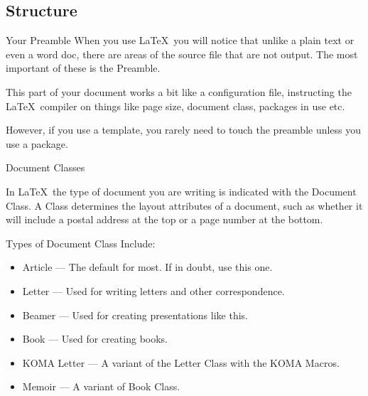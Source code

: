 \documentclass{beamer}
\begin{document}
\subsection{Structure}
\begin{frame}{Your Preamble}
When you use \LaTeX~you will notice that unlike a plain text or even a word doc, there are areas of the source file that are not output. The most important of these is the Preamble. \par
This part of your document works a bit like a configuration file, instructing the \LaTeX~compiler on things like page size, document class, packages in use etc.\par
However, if you use a template, you rarely need to touch the preamble unless you use a package.
\end{frame}


\begin{frame}{Document Classes}

In \LaTeX~the type of document you are writing is indicated with the Document Class. A Class determines the layout attributes of a document, such as whether it will include a postal address at the top or a page number at the bottom.\par
Types of Document Class Include:\\
\begin{itemize}
\item Article --- The default for most. If in doubt, use this one.
\item Letter --- Used for writing letters and other correspondence.
\item Beamer --- Used for creating presentations like this.
\item Book --- Used for creating books.
\item KOMA Letter --- A variant of the Letter Class with the KOMA Macros.
\item Memoir --- A variant of Book Class.
\end{itemize}

\end{frame}
\end{document}
